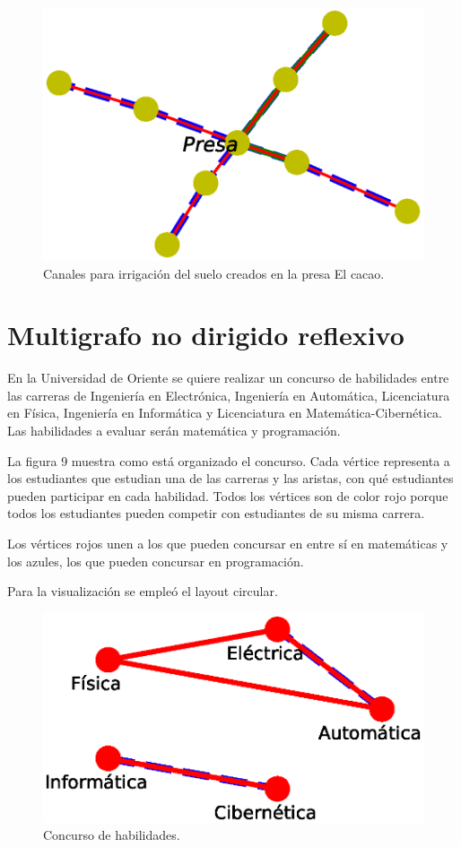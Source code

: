 \documentclass{article}
\begin{document}
\begin{figure}
  \includegraphics[width=.8\columnwidth]{fig8.eps}
  \caption{Canales para irrigación del suelo creados en la presa El cacao.}
  \label{Figura 8}
\end{figure}




\section{Multigrafo no dirigido reflexivo}

En la Universidad de Oriente se quiere realizar un concurso de habilidades entre las carreras de Ingeniería en Electrónica, Ingeniería en Automática, Licenciatura en Física, Ingeniería en Informática y Licenciatura en Matemática-Cibernética. Las habilidades a evaluar serán matemática y programación. 

La figura 9 muestra como está organizado el concurso. Cada vértice representa a los estudiantes que estudian una de las carreras y las aristas, con qué estudiantes pueden participar en cada habilidad. Todos los vértices son de color rojo porque todos los estudiantes pueden competir con estudiantes de su misma carrera.

Los vértices rojos unen a los que pueden concursar en entre sí en matemáticas y los azules, los que pueden concursar en programación.

Para la visualización se empleó el layout circular.

\begin{figure}
  \includegraphics[width=.8\columnwidth]{fig9.eps}
  \caption{Concurso de habilidades.}
  \label{Figura 9}
\end{figure}
\end{document}
